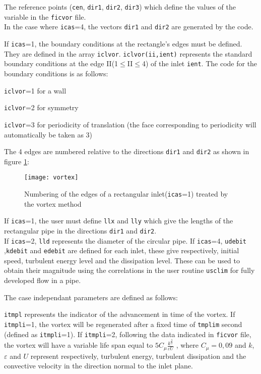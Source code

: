 {{{\begin{list}{-}{}
The reference points (\texttt{cen}, \texttt{dir1}, \texttt{dir2}, \texttt{dir3})
which define the values of the variable in the \texttt{ficvor} file.\\
In the case where \texttt{icas}=4, the vectors \texttt{dir1} and \texttt{dir2}
are generated by the code.

If \texttt{icas}=1, the boundary conditions at the rectangle's edges must be
defined. They are defined in the array
\texttt{iclvor}. \texttt{iclvor(ii,ient)} represents the standard boundary
conditions at the edge II(1$\leqslant$II$\leqslant$4) of the inlet
\texttt{ient}. The code for the boundary conditions is as follows:
\begin{list}{*}{}
\item \texttt{iclvor}=1 for a wall
\item \texttt{iclvor}=2 for symmetry
\item \texttt{iclvor}=3 for periodicity of translation (the face corresponding
      to periodicity will automatically be taken as 3)
\end{list}
The 4 edges are numbered relative to the directions \texttt{dir1} and
\texttt{dir2} as shown in figure \ref{Fig_vortex}:

\begin{figure}[!ht]
\centerline{
\texttt{[image: vortex]}}
\caption{Numbering of the edges of a rectangular inlet(\texttt{icas}=1)
 treated by the vortex method}\label{Fig_vortex}
\end{figure}

If \texttt{icas}=1, the user must define \texttt{llx} and \texttt{lly} which give
the lengths of the rectangular pipe in the directions \texttt{dir1} and \texttt{dir2}.\\
If \texttt{icas}=2, \texttt{lld} represents the diameter of the circular pipe.
If \texttt{icas}=4, \texttt{udebit} ,\texttt{kdebit} and \texttt{edebit} are
defined for each inlet, these give respectively,
initial speed, turbulent energy level and the dissipation level. These can be used to
 obtain their magnitude using the correlations in the user routine \texttt{usclim} for
 fully developed flow in a pipe.

 The case independant parameters are defined as follows:
\begin{list}{*}{}
\item \texttt{itmpl} represents the indicator of the advancement in time of the
  vortex. If \texttt{itmpli}=1, the vortex will be regenerated after a fixed
  time of
  \texttt{tmplim} second (defined as \texttt{itmpli}=1).
  If \texttt{itmpli}=2, following the data indicated in \texttt{ficvor} file,
  the vortex will have a variable life span equal to
  $5 \displaystyle C_\mu \displaystyle \frac{k^{\frac{3}{2}}}{\varepsilon U}$ ,
  where $C_\mu=0,09$ and $k$, $\varepsilon$ and $U$  represent respectively, turbulent energy,
  turbulent dissipation and the convective velocity in the direction normal to the inlet plane.


\end{list}
\end{list}}}}
